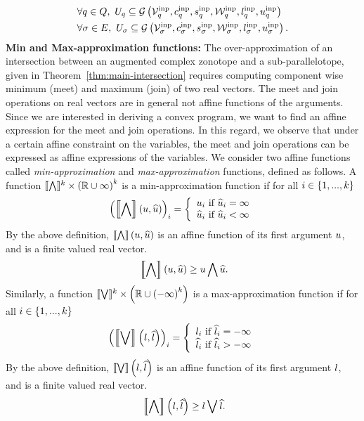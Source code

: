 %
\begin{align}
& \forall
\loc\in\locations,~\inputset_\loc\subseteq\acztope{\inputtemp_\loc}{\inputcen_\loc}{\inputsfact_\loc}{\inputstemp_\loc}{\inputlb_\loc}{\inputub_\loc}\\
& \forall \edge\in\edgeset,~\inputset_\edge\subseteq\acztope{\inputtemp_\edge}{\inputcen_\edge}{\inputsfact_\edge}{\inputstemp_\edge}{\inputlb_\edge}{\inputub_\edge}.
\end{align}
%
{\bf Min and Max-approximation functions:} The over-approximation of
an intersection between an augmented complex zonotope and a
sub-parallelotope, given in Theorem~\ref{thm:main-intersection}
requires computing component wise minimum (meet) and maximum (join) of
two real vectors.  The meet and join operations on real vectors are in
general not affine functions of the arguments.  Since we are
interested in deriving a convex program, we want to find an affine
expression for the meet and join operations.  In this regard, we
observe that under a certain affine constraint on the variables, the
meet and join operations can be expressed as affine expressions of the
variables.  We consider two affine functions
called \emph{min-approximation} and \emph{max-approximation}
functions, defined as follows.  A function
$\minapproxsymbol:\reals^k\times\lt(\reals\cup\infty\rt)^k$ is a
min-approximation function if for all $i\in\set{1,...,k}$
%
\[
\lt(\minapprox{\ub}{\pub}\rt)_i=
\lt\{
\begin{array}{l}
\ub_i~\text{if}~\pub_i=\infty\\
\pub_i~\text{if}~\pub_i<\infty
\end{array}
\rt.
\]
%
By the above definition, $\minapprox{\ub}{\pub}$ is an affine function of its
first argument $\ub$, and is a finite valued real vector.
%
\begin{equation}~\label{eqn:minapprox}
\minapprox{\ub}{\pub}\geq\meet{\ub}{\pub}.
\end{equation}
%
Similarly, a function
$\maxapproxsymbol:\reals^k\times\lt(\reals\cup\lt(-\infty\rt)^k\rt)$
is a max-approximation function if for all $i\in\set{1,...,k}$
%
\[
\lt(\maxapprox{\lb}{\plb}\rt)_i=
\lt\{
\begin{array}{l}
\lb_i~\text{if}~\plb_i=-\infty\\
\plb_i~\text{if}~\plb_i>-\infty
\end{array}
\rt.
\]
%
By the above definition, $\maxapprox{\lb}{\plb}$ is an affine function
of its first argument $\lb$, and is a finite valued real vector.
%
\begin{equation}~\label{eqn:minapprox}
\minapprox{\lb}{\plb}\geq\join{\lb}{\plb}.
\end{equation}
